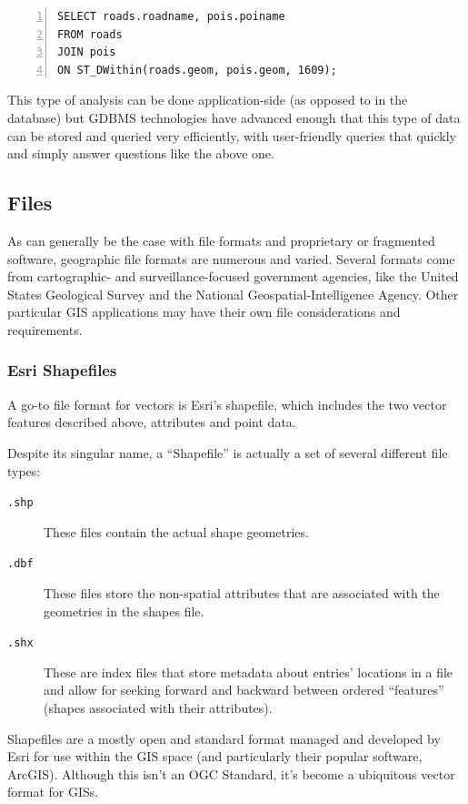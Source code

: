 \begin{Verbatim}[samepage=true,baselinestretch=1,numbers=left,xleftmargin=12mm]
SELECT roads.roadname, pois.poiname
FROM roads
JOIN pois 
ON ST_DWithin(roads.geom, pois.geom, 1609);
\end{Verbatim}

This type of analysis can be done application-side (as opposed to in the database) but GDBMS technologies have advanced enough that this type of data can be stored and queried very efficiently, with user-friendly queries that quickly and simply answer questions like the above one.

\subsection{Files}
\label{background_formats}
As can generally be the case with file formats and proprietary or fragmented software, geographic file formats are numerous and varied. Several formats come from cartographic- and surveillance-focused government agencies, like the United States Geological Survey and the National Geospatial-Intelligence Agency. Other particular GIS applications may have their own file considerations and requirements.

\subsubsection{Esri Shapefiles}
A go-to file format for vectors is Esri's shapefile, which includes the two vector features described above, attributes and point data.

Despite its singular name, a ``Shapefile'' is actually a set of several different file types:

\begin{description}
  \item[\tt{.shp}] These files contain the actual shape geometries.
  \item[\tt{.dbf}] These files store the non-spatial attributes that are associated with the geometries in the shapes file.
  \item[\tt{.shx}] These are index files that store metadata about entries' locations in a file and allow for seeking forward and backward between ordered ``features'' (shapes associated with their attributes).
\end{description}

Shapefiles are a mostly open and standard format managed and developed by Esri for use within the GIS space (and particularly their popular software, ArcGIS). Although this isn't an OGC Standard, it's become a ubiquitous vector format for GISs.

